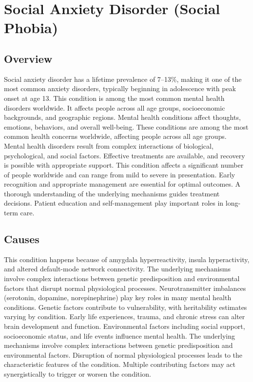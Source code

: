 \chapter{Social Anxiety Disorder (Social Phobia)}
\label{sec:Social Anxiety Disorder (Social Phobia)}

\section{Overview}
Social anxiety disorder has a lifetime prevalence of 7--13\%, making it one of the most common anxiety disorders, typically beginning in adolescence with peak onset at age 13. This condition is among the most common mental health disorders worldwide. It affects people across all age groups, socioeconomic backgrounds, and geographic regions. Mental health conditions affect thoughts, emotions, behaviors, and overall well-being. These conditions are among the most common health concerns worldwide, affecting people across all age groups. Mental health disorders result from complex interactions of biological, psychological, and social factors. Effective treatments are available, and recovery is possible with appropriate support. This condition affects a significant number of people worldwide and can range from mild to severe in presentation. Early recognition and appropriate management are essential for optimal outcomes. A thorough understanding of the underlying mechanisms guides treatment decisions. Patient education and self-management play important roles in long-term care.
\section{Causes}
This condition happens because of amygdala hyperreactivity, insula hyperactivity, and altered default-mode network connectivity. The underlying mechanisms involve complex interactions between genetic predisposition and environmental factors that disrupt normal physiological processes. Neurotransmitter imbalances (serotonin, dopamine, norepinephrine) play key roles in many mental health conditions. Genetic factors contribute to vulnerability, with heritability estimates varying by condition. Early life experiences, trauma, and chronic stress can alter brain development and function. Environmental factors including social support, socioeconomic status, and life events influence mental health. The underlying mechanisms involve complex interactions between genetic predisposition and environmental factors. Disruption of normal physiological processes leads to the characteristic features of the condition. Multiple contributing factors may act synergistically to trigger or worsen the condition.
